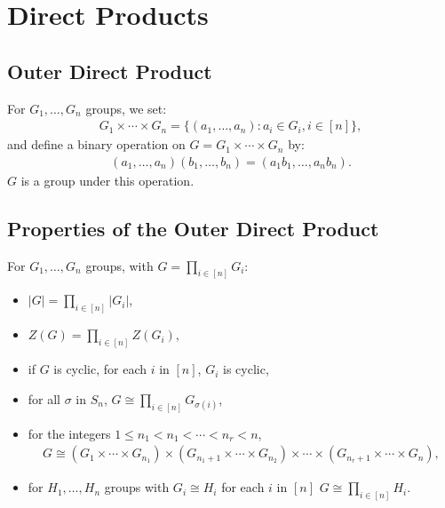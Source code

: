 \section{Direct Products}

\subsection{Outer Direct Product}

For $G_1, \ldots, G_n$ groups, we set: \begin{align*}
    G_1 \times \cdots \times G_n = \{(a_1, \ldots, a_n) : a_i \in G_i, i \in [n] \},
\end{align*} and define a binary operation on 
$G = G_1 \times \cdots \times G_n$ by: \begin{align*}
    (a_1, \ldots, a_n)(b_1, \ldots, b_n) = (a_1b_1, \ldots, a_nb_n).
\end{align*} $G$ is a group under this operation.

\subsection{Properties of the Outer Direct Product}

For $G_1, \ldots, G_n$ groups, with $G = \prod_{i \in [n]} G_i$: \begin{itemize}
    \item $|G| = \prod_{i \in [n]}|G_i|$,
    \item $Z(G) = \prod_{i \in [n]}Z(G_i)$,
    \item if $G$ is cyclic, for each $i$ in $[n]$, $G_i$ is cyclic,
    \item for all $\sigma$ in $S_n$, $G \cong \prod_{i \in [n]} G_{\sigma(i)}$,
    \item for the integers $1 \leq n_1 < n_1 < \cdots < n_r < n$, 
        \begin{gather*}
            G \cong 
            (G_1 \times \cdots \times G_{n_1}) \times 
            (G_{n_1 + 1} \times \cdots \times G_{n_2}) \times \cdots \times
            (G_{n_r + 1} \times \cdots \times G_n),
        \end{gather*}
    \item for $H_1, \ldots, H_n$ groups with $G_i \cong H_i$ for each $i$ in $[n]$
        $G \cong \prod_{i \in [n]} H_i$.
\end{itemize}

\subsection{}

